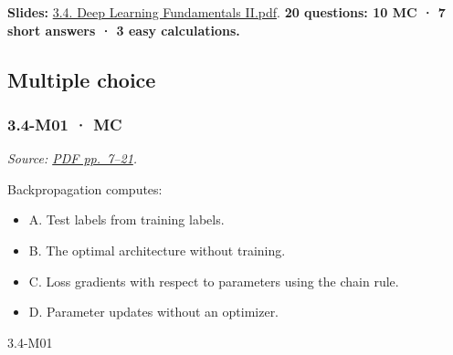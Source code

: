 \textbf{Slides:}
\href{../Lecture\%20Slides/3.4.\%20Deep\%20Learning\%20Fundamentals\%20II.pdf}{3.4.
Deep Learning Fundamentals II.pdf}. \textbf{20 questions: 10 MC · 7
short answers · 3 easy calculations.}

\subsection{Multiple choice}\label{multiple-choice-10}

\noindent\begin{minipage}{\linewidth}

\subsubsection{3.4-M01 · MC}\label{m01-mc-10}

\emph{Source:
\href{../Lecture\%20Slides/3.4.\%20Deep\%20Learning\%20Fundamentals\%20II.pdf\#page=7}{PDF
pp.~7--21}.}

Backpropagation computes:

\begin{itemize}
\tightlist
\item
  A. Test labels from training labels.
\item
  B. The optimal architecture without training.
\item
  C. Loss gradients with respect to parameters using the chain rule.
\item
  D. Parameter updates without an optimizer.
\end{itemize}

\begin{solution}[8mm]{3.4-M01}

\end{solution}
\end{minipage}\par\medskip

